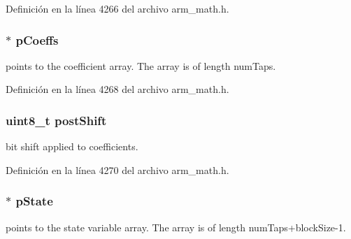 Definición en la línea 4266 del archivo arm\+\_\+math.\+h.

\subsubsection[{\texorpdfstring{p\+Coeffs}{pCoeffs}}]{$\ast$ p\+Coeffs}\hypertarget{structarm__lms__norm__instance__q15_a7ca181a37f714d174445f486bebce26f}{}\label{structarm__lms__norm__instance__q15_a7ca181a37f714d174445f486bebce26f}
points to the coefficient array. The array is of length num\+Taps. 

Definición en la línea 4268 del archivo arm\+\_\+math.\+h.

\subsubsection[{\texorpdfstring{post\+Shift}{postShift}}]{\setlength{\rightskip}{0pt plus 5cm}uint8\+\_\+t post\+Shift}\hypertarget{structarm__lms__norm__instance__q15_a74050e9f36542bd56f4052381a82ae8f}{}\label{structarm__lms__norm__instance__q15_a74050e9f36542bd56f4052381a82ae8f}
bit shift applied to coefficients. 

Definición en la línea 4270 del archivo arm\+\_\+math.\+h.

\subsubsection[{\texorpdfstring{p\+State}{pState}}]{$\ast$ p\+State}\hypertarget{structarm__lms__norm__instance__q15_ae29dfdb736374fcddaeaec4b7770170c}{}\label{structarm__lms__norm__instance__q15_ae29dfdb736374fcddaeaec4b7770170c}
points to the state variable array. The array is of length num\+Taps+block\+Size-\/1. 

